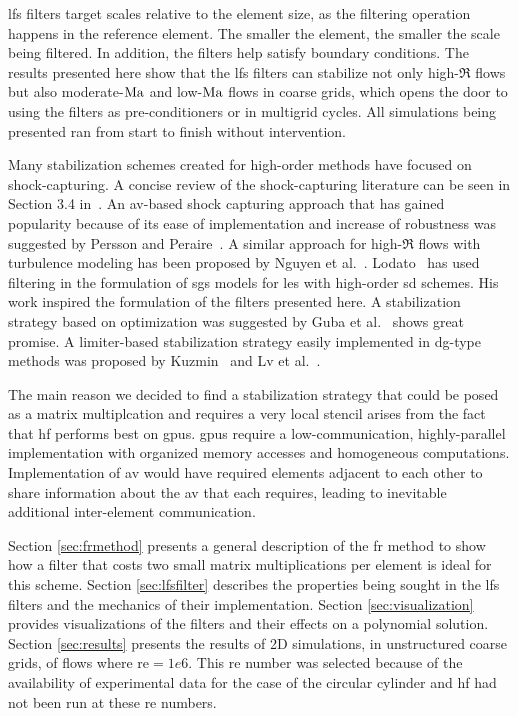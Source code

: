 \gls{lfs} filters target scales relative to the element size, as the filtering operation happens in the reference element. The smaller the element, the smaller the scale being filtered. In addition, the filters help satisfy boundary conditions. The  results presented here show that the \gls{lfs} filters can  stabilize not only high-$\Re$ flows but also moderate-$\mathrm{Ma}$ and low-$\mathrm{Ma}$ flows in coarse grids, which opens the door to using the filters as pre-conditioners or in multigrid cycles. All simulations being presented ran from start to finish without intervention.

Many stabilization schemes created for high-order methods have focused on shock-capturing. A concise review of the shock-capturing literature can be seen in Section 3.4 in~\cite{vincent2011facilitating}. An \gls{av}-based shock capturing approach that has gained popularity because of its ease of implementation and increase of robustness was suggested by Persson and Peraire~\cite{persson2006sub}. A similar approach for high-$\Re$ flows with turbulence modeling has been proposed by Nguyen et al.~\cite{nguyen2007rans}. Lodato~\cite{lodato2014structural} has used filtering in the formulation of \gls{sgs} models for \gls{les} with high-order \gls{sd} schemes. His work inspired the formulation of the filters presented here. A stabilization strategy based on optimization was suggested by Guba et al.~\cite{guba2014optimization} shows great promise. A limiter-based stabilization strategy easily implemented in \gls{dg}-type methods was proposed by Kuzmin~\cite{kuzmin2004high} and Lv et al.~\cite{lv2015entropy}.

The main reason we decided to find a stabilization strategy that could be posed as a matrix multiplcation and requires a very local stencil arises from the fact that \gls{hf} performs best on \gls{gpu}s. \gls{gpu}s require a low-communication, highly-parallel implementation with organized memory accesses and homogeneous computations. Implementation of \gls{av} would have required elements adjacent to each other to share information about the \gls{av} that each requires, leading to inevitable additional inter-element communication.

 Section \ref{sec:frmethod} presents a general description of the \gls{fr} method to show how a filter that costs two small matrix multiplications per element is ideal for this scheme. Section \ref{sec:lfsfilter} describes the properties being sought in the \gls{lfs} filters and the mechanics of their implementation. Section \ref{sec:visualization} provides visualizations of the filters and their effects on a polynomial solution. Section \ref{sec:results} presents the results of 2D simulations, in unstructured coarse grids, of flows where \gls{re}$= 1e6$. This \gls{re} number was selected because of the availability of experimental data for the case of the circular cylinder and \gls{hf} had not been run at these \gls{re} numbers.


